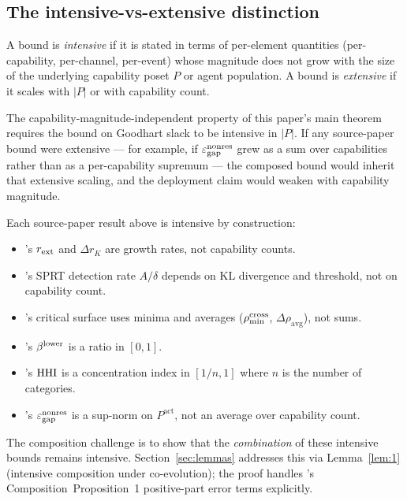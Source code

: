 \subsection{The intensive-vs-extensive distinction}
\label{sec:intensive_extensive}

A bound is \emph{intensive} if it is stated in terms of per-element quantities
(per-capability, per-channel, per-event) whose magnitude does not grow with the
size of the underlying capability poset $P$ or agent population. A bound is
\emph{extensive} if it scales with $|P|$ or with capability count.

The capability-magnitude-independent property of this paper's main theorem
requires the bound on Goodhart slack to be intensive in $|P|$. If any
source-paper bound were extensive --- for example, if $\varepsilon_{\mathrm{gap}}^{\mathrm{nonres}}$ grew as a
sum over capabilities rather than as a per-capability supremum --- the
composed bound would inherit that extensive scaling, and the deployment claim
would weaken with capability magnitude.

Each source-paper result above is intensive by construction:
\begin{itemize}
\item \citep[Horizon~Aware]{lasser2026horizon}'s $r_{\mathrm{ext}}$ and $\Delta r_K$ are growth rates, not
  capability counts.
\item \citep[Exogenous~Verification]{lasser2026exo}'s SPRT detection rate $A/\delta$ depends on KL
  divergence and threshold, not on capability count.
\item \citep[Phase~Redundancy]{lasser2026phase}'s critical surface uses minima and averages
  ($\rho_{\min}^{\mathrm{cross}}$, $\Delta\rho_{\mathrm{avg}}$), not sums.
\item \citep[Revealed~Sacrifice]{lasser2026paper8a}'s $\beta^{\mathrm{lower}}$ is a ratio in $[0,1]$.
\item \citep[Need~Sufficiency]{lasser2026paper8b}'s $\mathrm{HHI}$ is a concentration index in $[1/n, 1]$ where
  $n$ is the number of categories.
\item \citep[Microfoundation]{lasser2026micro}'s $\varepsilon_{\mathrm{gap}}^{\mathrm{nonres}}$ is a sup-norm on $P^{\mathrm{act}}$, not
  an average over capability count.
\end{itemize}

The composition challenge is to show that the \emph{combination} of
these intensive bounds remains intensive. Section~\ref{sec:lemmas}
addresses this via Lemma~\ref{lem:1} (intensive composition under
co-evolution); the proof handles \citep[Microfoundation]{lasser2026micro}'s
Composition~Proposition~1 positive-part error terms explicitly.

